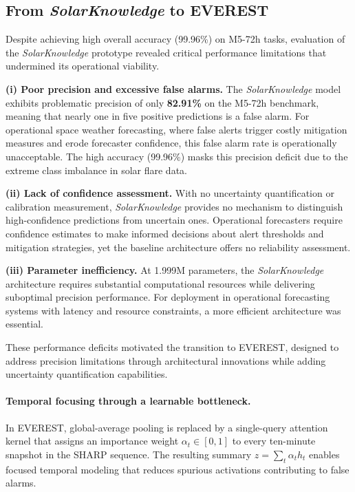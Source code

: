 \subsection{From \textit{SolarKnowledge} to \textsc{EVEREST}}
\label{sec:sk2ev-transition}
Despite achieving high overall accuracy (99.96\%) on M5-72h tasks, evaluation of the \textit{SolarKnowledge} prototype revealed critical performance limitations that undermined its operational viability.

\textbf{(i) Poor precision and excessive false alarms.}
The \textit{SolarKnowledge} model exhibits problematic precision of only \textbf{82.91\%} on the M5-72h benchmark, meaning that nearly one in five positive predictions is a false alarm. For operational space weather forecasting, where false alerts trigger costly mitigation measures and erode forecaster confidence, this false alarm rate is operationally unacceptable. The high accuracy (99.96\%) masks this precision deficit due to the extreme class imbalance in solar flare data.

\textbf{(ii) Lack of confidence assessment.}
With no uncertainty quantification or calibration measurement, \textit{SolarKnowledge} provides no mechanism to distinguish high-confidence predictions from uncertain ones. Operational forecasters require confidence estimates to make informed decisions about alert thresholds and mitigation strategies, yet the baseline architecture offers no reliability assessment.

\textbf{(iii) Parameter inefficiency.}
At 1.999M parameters, the \textit{SolarKnowledge} architecture requires substantial computational resources while delivering suboptimal precision performance. For deployment in operational forecasting systems with latency and resource constraints, a more efficient architecture was essential.

These performance deficits motivated the transition to \textsc{EVEREST}, designed to address precision limitations through architectural innovations while adding uncertainty quantification capabilities.

\paragraph{Temporal focusing through a learnable bottleneck.}
In \textsc{EVEREST}, global-average pooling is replaced by a single-query attention kernel that assigns an importance weight $\alpha_t\!\in\![0,1]$ to every ten-minute snapshot in the SHARP sequence. The resulting summary $z=\sum_{t}\alpha_{t}h_{t}$ enables focused temporal modeling that reduces spurious activations contributing to false alarms.

